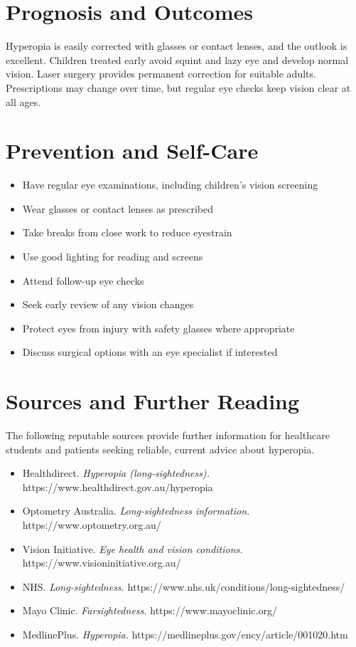 \section*{Prognosis and Outcomes}
Hyperopia is easily corrected with glasses or contact lenses, and the outlook is excellent. Children treated early avoid squint and lazy eye and develop normal vision. Laser surgery provides permanent correction for suitable adults. Prescriptions may change over time, but regular eye checks keep vision clear at all ages.

\section*{Prevention and Self-Care}
\begin{itemize}
    \item Have regular eye examinations, including children's vision screening
    \item Wear glasses or contact lenses as prescribed
    \item Take breaks from close work to reduce eyestrain
    \item Use good lighting for reading and screens
    \item Attend follow-up eye checks
    \item Seek early review of any vision changes
    \item Protect eyes from injury with safety glasses where appropriate
    \item Discuss surgical options with an eye specialist if interested
\end{itemize}

\section*{Sources and Further Reading}
The following reputable sources provide further information for healthcare students and patients seeking reliable, current advice about hyperopia.

\begin{itemize}
    \item Healthdirect. \textit{Hyperopia (long-sightedness).} https://www.healthdirect.gov.au/hyperopia
    \item Optometry Australia. \textit{Long-sightedness information.} https://www.optometry.org.au/
    \item Vision Initiative. \textit{Eye health and vision conditions.} https://www.visioninitiative.org.au/
    \item NHS. \textit{Long-sightedness.} https://www.nhs.uk/conditions/long-sightedness/
    \item Mayo Clinic. \textit{Farsightedness.} https://www.mayoclinic.org/
    \item MedlinePlus. \textit{Hyperopia.} https://medlineplus.gov/ency/article/001020.htm
\end{itemize}
